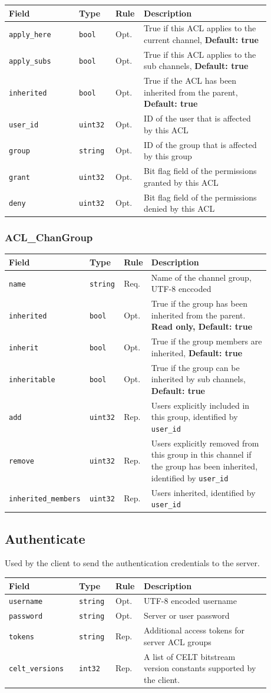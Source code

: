 \documentclass[11pt]{article} %
\newenvironment{mumbleMessageEx}
{%
	\small
	\renewcommand\arraystretch{1.5}
	\begin{tabular}{p{0.25\linewidth}p{0.13\linewidth}p{0.05\linewidth}p{0.45\linewidth}}
	Field & Type & Rule & Description \\
	\hline
}
{%
	\end{tabular}
	\renewcommand\arraystretch{1.0}
}
\newcommand{\mumbleMessageExItem}[4]{ \texttt{#1} & \texttt{#2} & #3 & #4 \\ }
\begin{document}
\begin{mumbleMessageEx}
\mumbleMessageExItem{apply\_here}{bool}{Opt.}{True if this ACL applies to the current channel, \textbf{Default: true}}
\mumbleMessageExItem{apply\_subs}{bool}{Opt.}{True if this ACL applies to the sub channels, \textbf{Default: true}}
\mumbleMessageExItem{inherited}{bool}{Opt.}{True if the ACL has been inherited from the parent, \textbf{Default: true}}
\mumbleMessageExItem{user\_id}{uint32}{Opt.}{ID of the user that is affected by this ACL}
\mumbleMessageExItem{group}{string}{Opt.}{ID of the group that is affected by this group}
\mumbleMessageExItem{grant}{uint32}{Opt.}{Bit flag field of the permissions granted by this ACL}
\mumbleMessageExItem{deny}{uint32}{Opt.}{Bit flag field of the permissions denied by this ACL}
\end{mumbleMessageEx}

\subsubsection{ACL\_ChanGroup}
\label{msg:chanGroup}

\begin{mumbleMessageEx}
\mumbleMessageExItem{name}{string}{Req.}{Name of the channel group, UTF-8 enccoded}
\mumbleMessageExItem{inherited}{bool}{Opt.}{True if the group has been inherited from the parent. \textbf{Read only, Default: true}}
\mumbleMessageExItem{inherit}{bool}{Opt.}{True if the group members are inherited, \textbf{Default: true}}
\mumbleMessageExItem{inheritable}{bool}{Opt.}{True if the group can be inherited by sub channels, \textbf{Default: true}}
\mumbleMessageExItem{add}{uint32}{Rep.}{Users explicitly included in this group, identified by \texttt{user\_id}}
\mumbleMessageExItem{remove}{uint32}{Rep.}{Users explicitly removed from this group in this channel if the group has been inherited, identified by \texttt{user\_id}}
\mumbleMessageExItem{inherited\_members}{uint32}{Rep.}{Users inherited, identified by \texttt{user\_id}}
\end{mumbleMessageEx}


\subsection{Authenticate}
\label{msg:authenticate}

Used by the client to send the authentication credentials to the server.

\begin{mumbleMessageEx}
\mumbleMessageExItem{username}{string}{Opt.}{UTF-8 encoded username}
\mumbleMessageExItem{password}{string}{Opt.}{Server or user password}
\mumbleMessageExItem{tokens}{string}{Rep.}{Additional access tokens for server ACL groups}
\mumbleMessageExItem{celt\_versions}{int32}{Rep.}{A list of CELT bitstream version constants supported by the client.}
\end{mumbleMessageEx}
\end{document}

